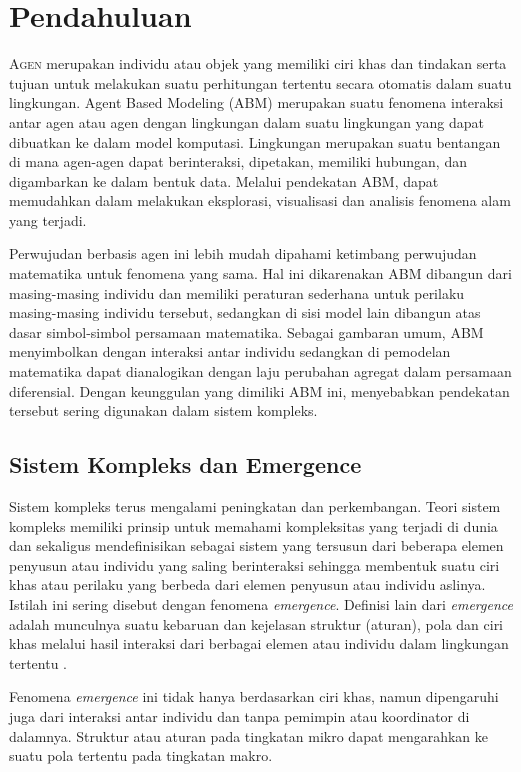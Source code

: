 \section{Pendahuluan}

\lettrine{A}{gen} merupakan individu atau objek yang memiliki ciri khas dan tindakan serta tujuan untuk melakukan suatu perhitungan tertentu secara otomatis dalam suatu lingkungan. Agent Based Modeling (ABM) merupakan suatu fenomena interaksi antar agen atau agen dengan lingkungan dalam suatu lingkungan yang dapat dibuatkan ke dalam model komputasi. Lingkungan merupakan suatu bentangan di mana agen-agen dapat berinteraksi, dipetakan, memiliki hubungan, dan digambarkan ke dalam bentuk data. Melalui pendekatan ABM, dapat memudahkan dalam melakukan eksplorasi, visualisasi dan analisis fenomena alam yang terjadi.

Perwujudan berbasis agen ini lebih mudah dipahami ketimbang perwujudan matematika untuk fenomena yang sama. Hal ini dikarenakan ABM dibangun dari masing-masing individu dan memiliki peraturan sederhana untuk perilaku masing-masing individu tersebut, sedangkan di sisi model lain dibangun atas dasar simbol-simbol persamaan matematika. Sebagai gambaran umum, ABM menyimbolkan dengan interaksi antar individu sedangkan di pemodelan matematika dapat dianalogikan dengan laju perubahan agregat dalam persamaan diferensial. Dengan keunggulan yang dimiliki ABM ini, menyebabkan pendekatan tersebut sering digunakan dalam sistem kompleks.

\subsection{Sistem Kompleks dan Emergence}

Sistem kompleks terus mengalami peningkatan dan perkembangan. Teori sistem kompleks memiliki prinsip untuk memahami kompleksitas yang terjadi di dunia dan sekaligus mendefinisikan sebagai sistem yang tersusun dari beberapa elemen penyusun atau individu yang saling berinteraksi sehingga membentuk suatu ciri khas atau perilaku yang berbeda dari elemen penyusun atau individu aslinya. Istilah ini sering disebut dengan fenomena \textit{emergence}. Definisi lain dari \textit{emergence} adalah munculnya suatu kebaruan dan kejelasan struktur (aturan), pola dan ciri khas melalui hasil interaksi dari berbagai elemen atau individu dalam lingkungan tertentu \cite{wilensky2015introduction}.

Fenomena \textit{emergence} ini tidak hanya berdasarkan ciri khas, namun dipengaruhi juga dari interaksi antar individu dan tanpa pemimpin atau koordinator di dalamnya. Struktur atau aturan pada tingkatan mikro dapat mengarahkan ke suatu pola tertentu pada tingkatan makro.

